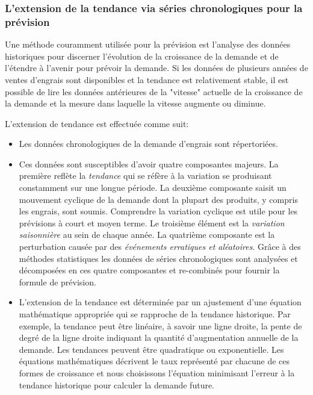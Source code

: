 	\subsubsection{L'extension de la tendance via séries chronologiques pour la prévision}
	Une méthode couramment utilisée pour la prévision est l'analyse des données historiques pour discerner l'évolution de la croissance de la demande et de l'étendre à l'avenir pour prévoir la demande. Si les données de plusieurs années de ventes d'engrais sont disponibles et la tendance est relativement stable, il est possible de lire les données antérieures de la "vitesse" actuelle de la croissance de la demande et la mesure dans laquelle la vitesse augmente ou diminue.\par
	L'extension de tendance est effectuée comme suit:
	\begin{itemize}
	\item Les données chronologiques de la demande d'engrais sont répertoriées.
	\item Ces données sont susceptibles d'avoir quatre composantes majeurs. La première reflète la \textit{tendance} qui se réfère à la variation se produisant constamment sur une longue période. La deuxième composante saisit un mouvement cyclique de la demande dont la plupart des produits, y compris les engrais, sont soumis. Comprendre la variation cyclique est utile pour les prévisions à court et moyen terme. Le troisième élément est la \textit{variation saisonnière} au sein de chaque année. La quatrième composante est la perturbation causée par des \textit{événements erratiques et aléatoires}. Grâce à des méthodes statistiques les données de séries chronologiques sont analysées et décomposées en ces quatre composantes et re-combinés pour fournir la formule de prévision.
	\item L'extension de la tendance est déterminée par un ajustement d'une équation mathématique appropriée qui se rapproche de la tendance historique. Par exemple, la tendance peut être linéaire, à savoir une ligne droite, la pente de degré de la ligne droite indiquant la quantité d'augmentation annuelle de la demande. Les tendances peuvent être quadratique ou exponentielle. Les équations mathématiques décrivent le taux représenté par chacune de ces formes de croissance et nous choisissons l'équation minimisant l'erreur à la tendance historique pour calculer la demande future.
	\end{itemize}
